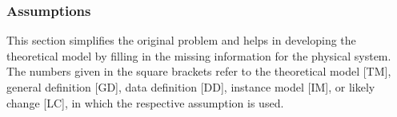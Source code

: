\documentclass[12pt]{article}
\begin{document}

\subsubsection{Assumptions} \label{sec-assumpt}


This section simplifies the original problem and helps in developing the
theoretical model by filling in the missing information for the physical system.
The numbers given in the square brackets refer to the theoretical model [TM],
general definition [GD], data definition [DD], instance model [IM], or likely
change [LC], in which the respective assumption is used.
\end{document}
